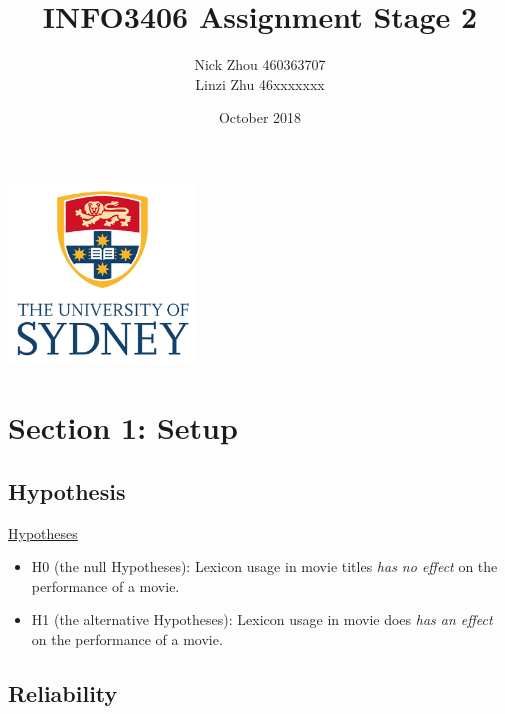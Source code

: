 \documentclass[font=10pt]{article}
\begin{document}
  \begin{titlepage}
    \centering
    \title{\textbf{INFO3406 Assignment Stage 2}}
    \author{
      Nick Zhou 460363707\\
      Linzi Zhu 46xxxxxxx
    }
    \date{October 2018}
    \maketitle
    \includegraphics[width=5cm]{usyd}
  \end{titlepage}

  \begin{tableofcontents}
    \tableofcontents
  \end{tableofcontents}

  \section{Section 1: Setup}
    \subsection{Hypothesis}
    \underline{Hypotheses}
    \begin{itemize}
      \item H0 (the null Hypotheses): Lexicon usage in movie titles \textit{has no effect} on the performance of a movie.
      \item H1 (the alternative Hypotheses): Lexicon usage in movie does \textit{has an effect} on the performance of a movie.
    \end{itemize}

    \subsection{Reliability}
\end{document}
